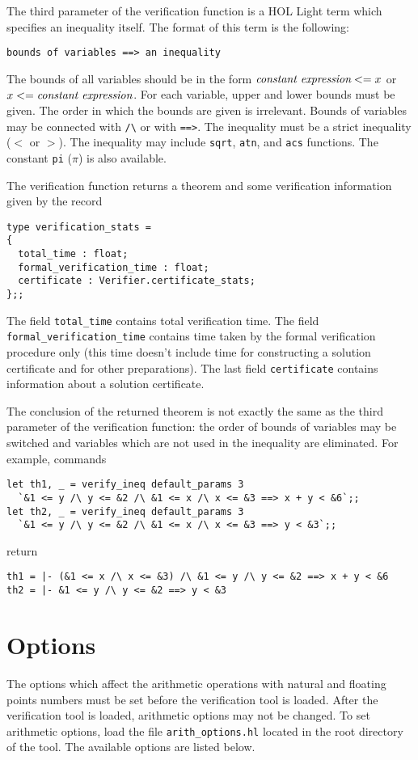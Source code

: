 \documentclass[a4paper]{article}
\begin{document}
The third parameter of the verification function is a HOL Light term which specifies an inequality itself. The format of this term is the following:
\begin{verbatim}
bounds of variables ==> an inequality
\end{verbatim}
The bounds of all variables should be in the form $\text{\it constant expression} <= x$ or $x <= \text{\it constant expression}$. For each variable, upper and lower bounds must be given. The order in which the bounds are given is irrelevant. Bounds of variables may be connected with \verb|/\| or with \verb|==>|. The inequality must be a strict inequality ($<$ or $>$). The inequality may include \verb|sqrt|, \verb|atn|, and \verb|acs| functions. The constant \verb|pi| ($\pi$) is also available.

The verification function returns a theorem and some verification information given by the record
\begin{verbatim}
type verification_stats =
{
  total_time : float;
  formal_verification_time : float;
  certificate : Verifier.certificate_stats;
};;
\end{verbatim}
The field \verb|total_time| contains total verification time. The field \verb|formal_verification_time| contains time taken by the formal verification procedure only (this time doesn't include time for constructing a solution certificate and for other preparations). The last field \verb|certificate| contains information about a solution certificate.

The conclusion of the returned theorem is not exactly the same as the third parameter of the verification function: the order of bounds of variables may be switched and variables which are not used in the inequality are eliminated. For example, commands
\begin{verbatim}
let th1, _ = verify_ineq default_params 3 
  `&1 <= y /\ y <= &2 /\ &1 <= x /\ x <= &3 ==> x + y < &6`;;
let th2, _ = verify_ineq default_params 3 
  `&1 <= y /\ y <= &2 /\ &1 <= x /\ x <= &3 ==> y < &3`;;
\end{verbatim}
return
\begin{verbatim}
th1 = |- (&1 <= x /\ x <= &3) /\ &1 <= y /\ y <= &2 ==> x + y < &6
th2 = |- &1 <= y /\ y <= &2 ==> y < &3
\end{verbatim}






\section{Options}
The options which affect the arithmetic operations with natural and floating points numbers must be set before the verification tool is loaded. After the verification tool is loaded, arithmetic options may not be changed. To set arithmetic options, load the file \verb|arith_options.hl| located in the root directory of the tool. The available options are listed below.
\end{document}
